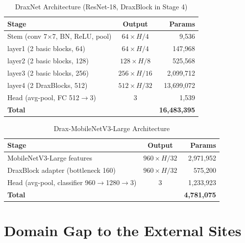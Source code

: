 \documentclass[conference, letterpaper]{IEEEtran}
\begin{document}
\begin{table}[H]
\renewcommand{\arraystretch}{1.2}
\centering
\begin{threeparttable}
\caption{DraxNet Architecture (ResNet-18, DraxBlock in Stage 4)}
\label{tab:arch_draxnet}
\footnotesize
\begin{tabularx}{\columnwidth}{@{}X c r@{}}
\toprule
\textbf{Stage} & \textbf{Output} & \textbf{Params} \\
\midrule
Stem (conv 7$\times$7, BN, ReLU, pool) & $64\times H/4$ & 9,536 \\
layer1 (2 basic blocks, 64) & $64\times H/4$ & 147,968 \\
layer2 (2 basic blocks, 128) & $128\times H/8$ & 525,568 \\
layer3 (2 basic blocks, 256) & $256\times H/16$ & 2,099,712 \\
layer4 (2 DraxBlocks, 512) & $512\times H/32$ & 13,699,072 \\
Head (avg-pool, FC 512$\to$3) & 3 & 1,539 \\
\midrule
\textbf{Total} & & \textbf{16,483,395} \\
\bottomrule
\end{tabularx}
\end{threeparttable}
\end{table}

\begin{table}[H]
\renewcommand{\arraystretch}{1.2}
\centering
\begin{threeparttable}
\caption{Drax-MobileNetV3-Large Architecture}
\label{tab:arch_draxmobilenet}
\footnotesize
\begin{tabularx}{\columnwidth}{@{}X c r@{}}
\toprule
\textbf{Stage} & \textbf{Output} & \textbf{Params} \\
\midrule
MobileNetV3-Large features & $960\times H/32$ & 2,971,952 \\
DraxBlock adapter (bottleneck 160) & $960\times H/32$ & 575,200 \\
Head (avg-pool, classifier 960$\to$1280$\to$3) & 3 & 1,233,923 \\
\midrule
\textbf{Total} & & \textbf{4,781,075} \\
\bottomrule
\end{tabularx}
\end{threeparttable}
\end{table}

\section{Domain Gap to the External Sites}
\label{app:domain_gap}
\end{document}
